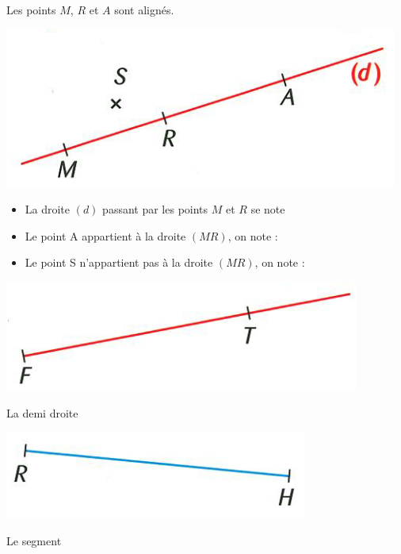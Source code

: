 \documentclass[12pt,a4paper]{article}
\date{}
\title{}
\begin{document}



\begin{myex}
	Les points $M$, $R$ et $A$ sont alignés.
	\begin{center}
		\includegraphics[scale=0.55]{img/droite1}
	\end{center}
	
	\begin{itemize}
		\item La droite $(d)$ passant par les points $M$ et $R$ se note 
		\item Le point A appartient à la droite $(MR)$, on note :
		\item Le point S n'appartient pas à la droite $(MR)$, on note :
	\end{itemize}
\end{myex}



\begin{myex}
	\begin{center}
		\includegraphics[scale=0.55]{img/demi-droite}
	\end{center}
	
	La demi droite 
\end{myex}



\begin{myex}
	\begin{center}
		\includegraphics[scale=0.55]{img/segment}
	\end{center}
	
	Le segment 
\end{myex}


	
\end{document}
